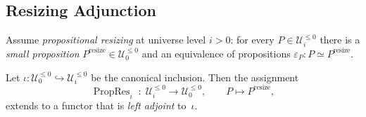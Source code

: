 \documentclass[a4paper,11pt]{article}
\newcommand{\resize}{\mathrm{resize}}
\begin{document}
\subsection{Resizing Adjunction}
\begin{proposition}\label{prop:resizing-adjunction}
Assume \emph{propositional resizing} at universe level $i>0$:  
for every $P\in\mathcal U_{i}^{\le 0}$ there is a
\emph{small proposition} $P^{\resize}\in\mathcal U_{0}^{\le 0}$
and an equivalence of propositions
\(
  \varepsilon_{P}\colon P\simeq P^{\resize}.
\)

Let
\(
  \iota\colon\mathcal U_{0}^{\le 0}\hookrightarrow
            \mathcal U_{i}^{\le 0}
\)
be the canonical inclusion.
Then the assignment
\[
  \operatorname{PropRes}_{i}\;\colon\;
    \mathcal U_{i}^{\le 0}\longrightarrow\mathcal U_{0}^{\le 0},
  \qquad
  P\longmapsto P^{\resize},
\]
extends to a functor that is \emph{left adjoint} to~$\iota$.
\end{proposition}
\end{document}
